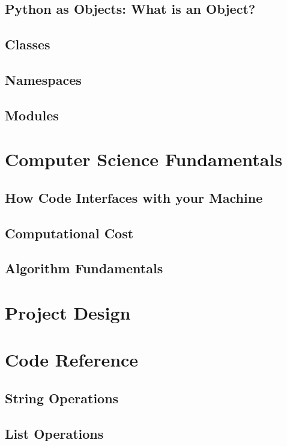 \documentclass[a4paper,11pt]{article}
\begin{document}
\subsection{Python as Objects: What is an Object?}

\pagebreak
\subsection{Classes}

\pagebreak
\subsection{Namespaces}

\pagebreak
\subsection{Modules}

\pagebreak
\section{Computer Science Fundamentals}
\subsection{How Code Interfaces with your Machine}

\pagebreak
\subsection{Computational Cost}

\pagebreak
\subsection{Algorithm Fundamentals}

\pagebreak
\section{Project Design}

\pagebreak
\section{Code Reference}
\subsection{String Operations}

\subsection{List Operations}
\end{document}
